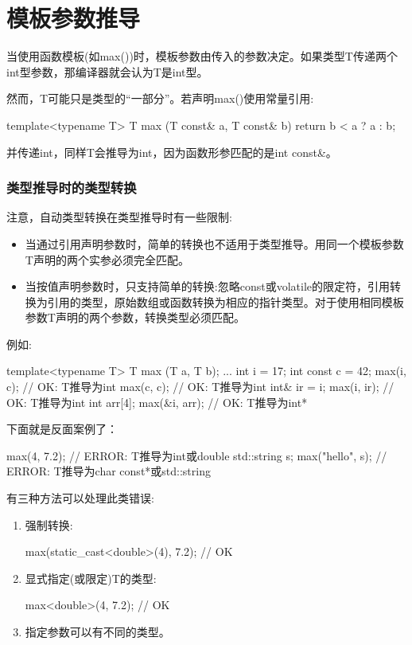 \section{模板参数推导}

当使用函数模板(如max())时，模板参数由传入的参数决定。如果类型T传递两个int型参数，那编译器就会认为T是int型。

然而，T可能只是类型的“一部分”。若声明max()使用常量引用:

\begin{cpp}
template<typename T>
T max (T const& a, T const& b)
{
	return b < a ? a : b;
}
\end{cpp}

并传递int，同样T会推导为int，因为函数形参匹配的是int const\&。

\subsubsection{类型推导时的类型转换}

注意，自动类型转换在类型推导时有一些限制:

\begin{itemize}
\item
当通过引用声明参数时，简单的转换也不适用于类型推导。用同一个模板参数T声明的两个实参必须完全匹配。

\item
当按值声明参数时，只支持简单的转换:忽略const或volatile的限定符，引用转换为引用的类型，原始数组或函数转换为相应的指针类型。对于使用相同模板参数T声明的两个参数，转换类型必须匹配。
\end{itemize}

例如:

\begin{cpp}
template<typename T>
T max (T a, T b);
...
int i = 17;
int const c = 42;
max(i, c); // OK: T推导为int
max(c, c); // OK: T推导为int
int& ir = i;
max(i, ir); // OK: T推导为int
int arr[4];
max(&i, arr); // OK: T推导为int*
\end{cpp}

下面就是反面案例了：

\begin{cpp}
max(4, 7.2); // ERROR: T推导为int或double
std::string s;
max("hello", s); // ERROR: T推导为char const*或std::string
\end{cpp}

有三种方法可以处理此类错误:

\begin{enumerate}
\item
强制转换:
\begin{cpp}
max(static_cast<double>(4), 7.2); // OK
\end{cpp}

\item
显式指定(或限定)T的类型:
\begin{cpp}
max<double>(4, 7.2); // OK
\end{cpp}

\item
指定参数可以有不同的类型。
\end{enumerate}

